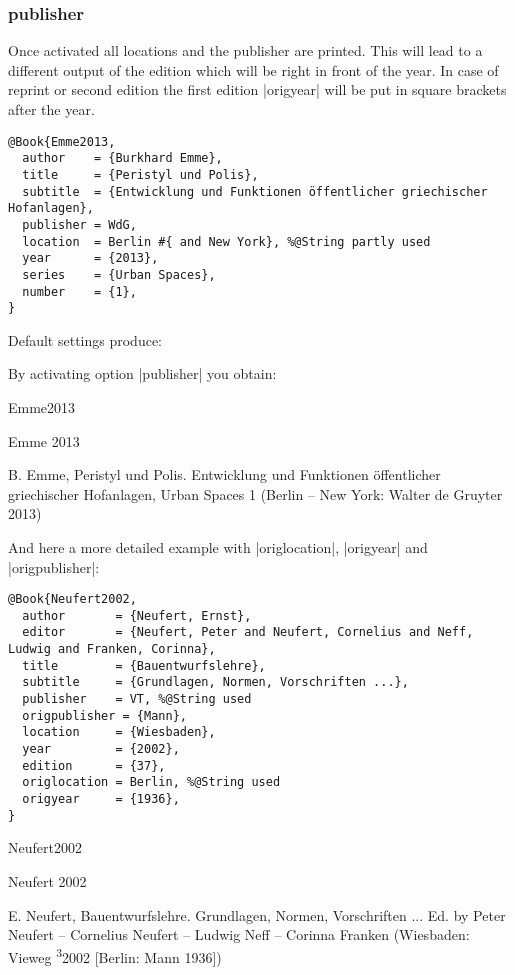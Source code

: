 \documentclass[a4paper,
10pt,
greek,
french,
spanish,
italian,
ngerman,
english
]{ltxdoc}
\begin{document}
\subsubsection{publisher}\label{publisher}
Once activated all locations and the publisher are printed. 
This will lead to a different output of the edition which will be right in front of the year.
In case of reprint or second edition the first edition |origyear| will be put in square brackets after the year.

\begin{lstlisting}[style=bibentry,label=Emme2013,caption={{@}Book\{Emme2013,…\} }]
@Book{Emme2013,
  author    = {Burkhard Emme},
  title     = {Peristyl und Polis},
  subtitle  = {Entwicklung und Funktionen öffentlicher griechischer Hofanlagen},
  publisher = WdG,
  location  = Berlin #{ and New York}, %@String partly used
  year      = {2013},
  series    = {Urban Spaces},
  number    = {1},
}
\end{lstlisting}
\begin{refsection}\end{refsection}

Default settings produce:
 
By activating option |publisher| you obtain:

\begin{bibbsp}{Emme2013}
\parbox[t]{1.7cm}{Emme 2013} \parbox[t]{9.4cm}{B. Emme, Peristyl und Polis. Entwicklung und Funktionen öffentlicher griechischer Hofanlagen, Urban Spaces 1 (Berlin {\color{red} – New York: Walter de Gruyter} 2013)}
\end{bibbsp}
 
And here a more detailed example with |origlocation|, |origyear| and |origpublisher|:
\begin{lstlisting}[style=bibentry,label=Neufert2002,caption={{@}Book\{Neufert2002,…\} }]
@Book{Neufert2002,
  author       = {Neufert, Ernst},
  editor       = {Neufert, Peter and Neufert, Cornelius and Neff, Ludwig and Franken, Corinna},
  title        = {Bauentwurfslehre},
  subtitle     = {Grundlagen, Normen, Vorschriften ...},
  publisher    = VT, %@String used
  origpublisher = {Mann},
  location     = {Wiesbaden},
  year         = {2002},
  edition      = {37},
  origlocation = Berlin, %@String used
  origyear     = {1936},
}
\end{lstlisting}
 

\begin{bibbsp}{Neufert2002}
\parbox[t]{1.7cm}{Neufert  2002} \parbox[t]{9.4cm}{%
E. Neufert, Bauentwurfslehre. Grundlagen, Normen, Vorschriften ... Ed. by Peter Neufert – Cornelius Neufert – Ludwig Neff  – Corinna Franken {\color{red} (Wiesbaden: Vieweg \textsuperscript{3}2002 [Berlin: Mann 1936])}}
\end{bibbsp}
 
\end{document}
